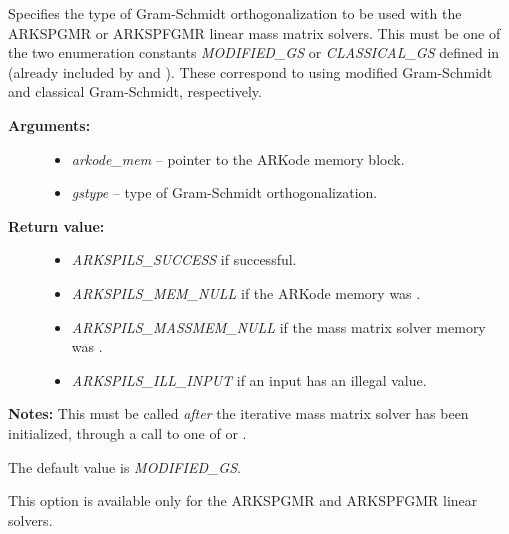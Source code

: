 \documentclass[letterpaper,10pt,english]{sphinxmanual}
\begin{document}

\begin{fulllineitems}
\label{c_interface/User_callable:c.ARKSpilsSetMassGSType}
Specifies the type of Gram-Schmidt orthogonalization to
be used with the ARKSPGMR or ARKSPFGMR linear mass matrix
solvers. This must be one of the two enumeration constants
\emph{MODIFIED\_GS} or \emph{CLASSICAL\_GS} defined in 
(already included by  and
). These correspond to using modified
Gram-Schmidt and classical Gram-Schmidt, respectively.
\begin{description}
\item[{\textbf{Arguments:}}] \leavevmode\begin{itemize}
\item {} 
\emph{arkode\_mem} -- pointer to the ARKode memory block.

\item {} 
\emph{gstype} -- type of Gram-Schmidt orthogonalization.

\end{itemize}

\item[{\textbf{Return value:}}] \leavevmode\begin{itemize}
\item {} 
\emph{ARKSPILS\_SUCCESS} if successful.

\item {} 
\emph{ARKSPILS\_MEM\_NULL} if the ARKode memory was .

\item {} 
\emph{ARKSPILS\_MASSMEM\_NULL} if the mass matrix solver memory was .

\item {} 
\emph{ARKSPILS\_ILL\_INPUT} if an input has an illegal value.

\end{itemize}

\end{description}

\textbf{Notes:} This must be called \emph{after} the iterative mass matrix
solver has been initialized, through a call to one of
{\hyperref[c_interface/User_callable:c.ARKMassSpgmr]{\emph{}}} or {\hyperref[c_interface/User_callable:c.ARKMassSpfgmr]{\emph{}}}.

The default value is \emph{MODIFIED\_GS}.

This option is available only for the ARKSPGMR and ARKSPFGMR linear
solvers.

\end{fulllineitems}
\end{document}
